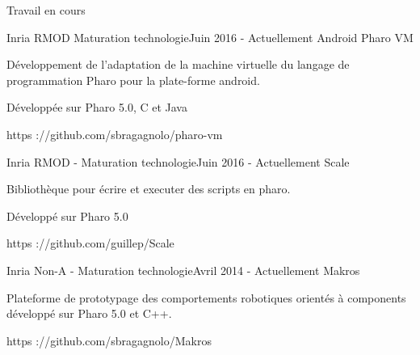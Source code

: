 \documentclass{resume} %
\begin{document}
\begin{rSection}{Travail en cours}
	\begin{rSubsection}{Inria RMOD Maturation technologie}{Juin 2016 - Actuellement }{Android Pharo VM}
		\item		
		\item D\'{e}veloppement de l'adaptation de la  machine virtuelle du langage de programmation Pharo pour la plate-forme android.
		\item D\'{e}velopp\'{e}e sur Pharo 5.0, C et Java
 		\item https ://github.com/sbragagnolo/pharo-vm		
	\end{rSubsection}
	
	\begin{rSubsection}{Inria RMOD - Maturation technologie}{Juin 2016 - Actuellement }{Scale}
		\item 
		\item Biblioth\`eque pour \'ecrire et executer des scripts en pharo. 
		\item D\'{e}velopp\'{e} sur Pharo 5.0 
		\item https ://github.com/guillep/Scale		
	\end{rSubsection}
	
	\begin{rSubsection}{Inria Non-A - Maturation technologie}{Avril 2014 - Actuellement }{Makros}
		\item 
		\item Plateforme de prototypage des comportements robotiques orient\'{e}s \`a components d\'{e}velopp\'{e} sur Pharo 5.0 et C++.
		\item https ://github.com/sbragagnolo/Makros		
	\end{rSubsection}
	

\end{rSection}
\end{document}
